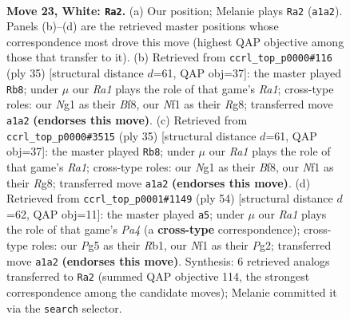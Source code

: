 \documentclass[11pt]{article}
\begin{document}
\clearpage

\begin{figure}[p]\centering
\begin{subfigure}{0.46\textwidth}\centering
\resizebox{\linewidth}{!}{%
\newchessgame
\chessboard[
  setfen={r1b1kb1r/5p2/4p3/4n1P1/p2p3p/P7/2K3PP/R1B2NNR w kq - 0 23},
  showmover=false,
  pgfstyle=straightmove, color=movearrow, markmove={a1-a2}
]}
\caption{}
\end{subfigure}\hfill
\begin{subfigure}{0.46\textwidth}\centering
\resizebox{\linewidth}{!}{%
\newchessgame
\chessboard[
  setfen={r1b1kbr1/5p2/pPp2p1p/7P/3P3N/4P2P/PP6/R3KB1R b KQq - 0 18},
  showmover=false,
  pgfstyle=straightmove, color=movearrow, markmove={a8-b8}
]}
\caption{}
\end{subfigure}
\\[4pt]
\begin{subfigure}{0.46\textwidth}\centering
\resizebox{\linewidth}{!}{%
\newchessgame
\chessboard[
  setfen={r1b1kbr1/5p2/pPp2p1p/7P/3P3N/4P2P/PP6/R3KB1R b KQq - 0 18},
  showmover=false,
  pgfstyle=straightmove, color=movearrow, markmove={a8-b8}
]}
\caption{}
\end{subfigure}\hfill
\begin{subfigure}{0.46\textwidth}\centering
\resizebox{\linewidth}{!}{%
\newchessgame
\chessboard[
  setfen={r1b2r2/p1B1p2k/5b1p/2NR1p2/P5p1/4P3/5PPP/1R4K1 w - - 1 28},
  showmover=false,
  pgfstyle=straightmove, color=movearrow, markmove={a4-a5}
]}
\caption{}
\end{subfigure}
\caption{\textbf{Move 23, White: \texttt{Ra2}.} (a) Our position; Melanie plays \texttt{Ra2} (\texttt{a1a2}). Panels (b)--(d) are the retrieved master positions whose correspondence most drove this move (highest QAP objective among those that transfer to it). (b) Retrieved from \texttt{ccrl\_top\_p0000\#116} (ply 35) [structural distance $d$=61, QAP obj=37]: the master played \texttt{Rb8}; under $\mu$ our \emph{Ra1} plays the role of that game's \emph{Ra1}; cross-type roles: our \emph{N}g1 as their \emph{B}f8, our \emph{N}f1 as their \emph{R}g8; transferred move \texttt{a1a2} \textbf{(endorses this move)}. (c) Retrieved from \texttt{ccrl\_top\_p0000\#3515} (ply 35) [structural distance $d$=61, QAP obj=37]: the master played \texttt{Rb8}; under $\mu$ our \emph{Ra1} plays the role of that game's \emph{Ra1}; cross-type roles: our \emph{N}g1 as their \emph{B}f8, our \emph{N}f1 as their \emph{R}g8; transferred move \texttt{a1a2} \textbf{(endorses this move)}. (d) Retrieved from \texttt{ccrl\_top\_p0001\#1149} (ply 54) [structural distance $d$=62, QAP obj=11]: the master played \texttt{a5}; under $\mu$ our \emph{Ra1} plays the role of that game's \emph{Pa4} (a \textbf{cross-type} correspondence); cross-type roles: our \emph{P}g5 as their \emph{R}b1, our \emph{N}f1 as their \emph{P}g2; transferred move \texttt{a1a2} \textbf{(endorses this move)}. Synthesis: 6 retrieved analogs transferred to \texttt{Ra2} (summed QAP objective 114, the strongest correspondence among the candidate moves); Melanie committed it via the \texttt{search} selector.}
\label{fig:thought-m44}
\end{figure}
\end{document}
